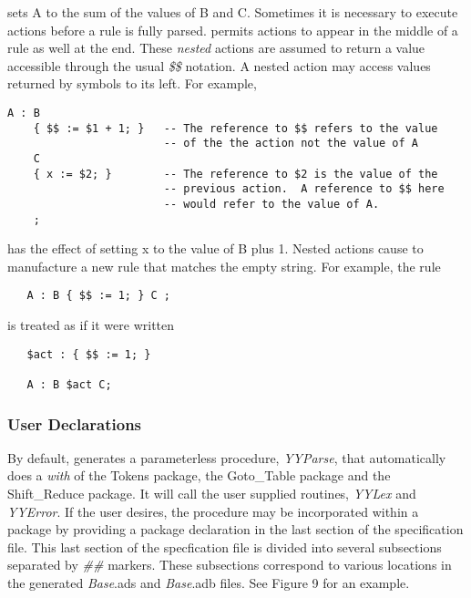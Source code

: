 \noindent sets A to the sum of the values of B and C.
\newpage
Sometimes it is necessary to execute actions before a rule is fully
parsed.  \ayacc permits actions to appear in the middle of a rule
as well at the end.  These {\it nested} actions are assumed to return
a value accessible through the usual
{\it \$\$}
notation.  A nested
action may access values returned by symbols to its left.  For
example,
\begin{verbatim}
A : B
    { $$ := $1 + 1; }   -- The reference to $$ refers to the value
                        -- of the the action not the value of A
    C
    { x := $2; }        -- The reference to $2 is the value of the
                        -- previous action.  A reference to $$ here
                        -- would refer to the value of A.
    ;
\end{verbatim}
has the effect of setting x to the value of B plus 1.  Nested actions
cause \ayacc to manufacture a new rule
that matches the  empty string.  For example, the rule
\begin{verbatim}
   A : B { $$ := 1; } C ;
\end{verbatim}
is treated as if it were written
\begin{verbatim}
   $act : { $$ := 1; }

   A : B $act C;
\end{verbatim}
\vspace{-0.3in}\hspace{1.3in}\footnotemark\vspace{0.3in}
\subsubsection{User Declarations}
By default, \ayacc generates a parameterless procedure,
{\it YYParse},
that automatically does a {\it with} of the Tokens package, the
Goto\_Table package and the Shift\_Reduce package. It will call
the user supplied routines,
{\it YYLex}
and
{\it YYError}.
If the user desires, the procedure
may be incorporated within a package by providing a package
declaration in the last section of the specification file.  This last
section of the specfication file is divided into several subsections
separated by {\it \#\#} markers. These subsections correspond to various
locations in the generated {\it Base}.ads and {\it Base}.adb files.
See Figure 9 for an example.

